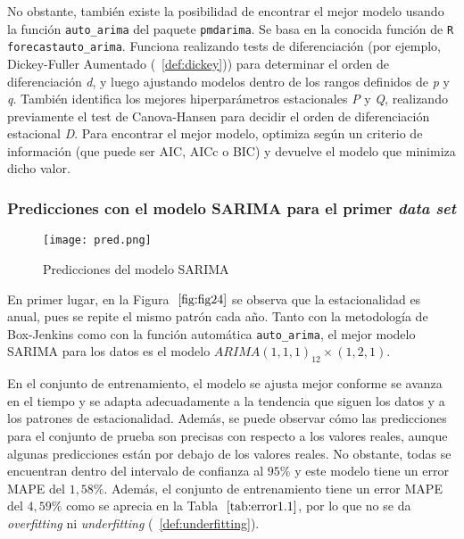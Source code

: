 \documentclass[12pt,twoside]{article}
\begin{document}
No obstante, también existe la posibilidad de encontrar el mejor modelo usando la función \texttt{auto\_arima} del paquete \texttt{pmdarima}. Se basa en la conocida función de \texttt{R} \newline \texttt{forecast\:\:auto\_arima}. Funciona realizando tests de diferenciación (por ejemplo, Dickey-Fuller Aumentado (~\ref{def:dickey})) para determinar el orden de diferenciación \textit{d}, y luego ajustando modelos dentro de los rangos definidos de \textit{p} y \textit{q}. También identifica los mejores hiperparámetros estacionales \textit{P} y \textit{Q}, realizando previamente el test de Canova-Hansen para decidir el orden de diferenciación estacional \textit{D}. Para encontrar el mejor modelo, optimiza según un criterio de información (que puede ser AIC, AICc o BIC) y devuelve el modelo que minimiza dicho valor.

\subsubsection{Predicciones con el modelo SARIMA para el primer \textit{data set}}\label{sec:36}

\begin{figure}[h]
    \centering
    \texttt{[image: pred.png]}
    \caption{Predicciones del modelo SARIMA} 
    \label{fig:fig24}
\end{figure}

En primer lugar, en la Figura $~\ref{fig:fig24}$ se observa que la estacionalidad es anual, pues se repite el mismo patrón cada año. Tanto con la metodología de Box-Jenkins como con la función automática \texttt{auto\_arima}, el mejor modelo SARIMA para los datos es el modelo $ARIMA(1,1,1)_{12} \times (1,2,1)$.

En el conjunto de entrenamiento, el modelo se ajusta mejor conforme se avanza en el tiempo y se adapta adecuadamente a la tendencia que siguen los datos y a los patrones de estacionalidad. Además, se puede observar cómo las predicciones para el conjunto de prueba son precisas con respecto a los valores reales, aunque algunas predicciones están por debajo de los valores reales. No obstante, todas se encuentran dentro del intervalo de confianza al $95\%$ y este modelo tiene un error MAPE del $1,58\%$.  Además, el conjunto de entrenamiento tiene un error MAPE del $4,59\%$ como se aprecia en la Tabla $~\ref{tab:error1.1}$, por lo que no se da \textit{overfitting} ni \textit{underfitting} (~\ref{def:underfitting}).
\end{document}
